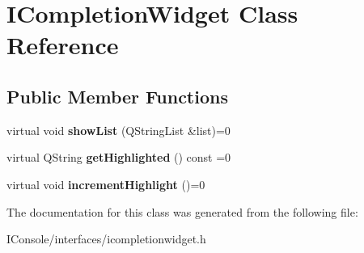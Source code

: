 \hypertarget{class_i_completion_widget}{\section{I\-Completion\-Widget Class Reference}
\label{class_i_completion_widget}
}
\subsection*{Public Member Functions}
\begin{DoxyCompactItemize}
\item 
\hypertarget{class_i_completion_widget_a7d4605c0db4a8181d4ab106f3f073210}{virtual void {\bfseries show\-List} (Q\-String\-List \&list)=0}\label{class_i_completion_widget_a7d4605c0db4a8181d4ab106f3f073210}

\item 
\hypertarget{class_i_completion_widget_a2d3553dd808ca776848720e454711a63}{virtual Q\-String {\bfseries get\-Highlighted} () const =0}\label{class_i_completion_widget_a2d3553dd808ca776848720e454711a63}

\item 
\hypertarget{class_i_completion_widget_a6f42b642287323cd4affdfd99ae9fa41}{virtual void {\bfseries increment\-Highlight} ()=0}\label{class_i_completion_widget_a6f42b642287323cd4affdfd99ae9fa41}

\end{DoxyCompactItemize}


The documentation for this class was generated from the following file\-:\begin{DoxyCompactItemize}
\item 
I\-Console/interfaces/icompletionwidget.\-h\end{DoxyCompactItemize}
